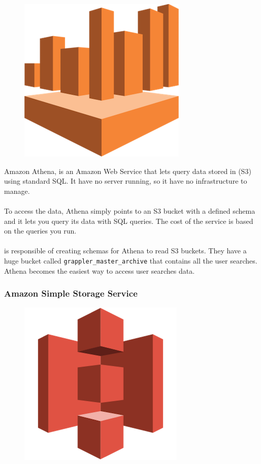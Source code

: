 \begin{figure}[H]
\includegraphics[scale=0.1]{resources/athena-logo.png}
\end{figure}

Amazon Athena\cite{athena}, is an Amazon Web Service that lets query data stored in  (S3) using standard SQL\cite{sql}. It have no server running, so it have no infrastructure to manage.
\\\\
To access the data, Athena simply points to an S3 bucket with a defined schema and it lets you query its data with SQL queries. The cost of the service is based on the queries you run.
\\\\
 is responsible of creating schemas for Athena to read S3 buckets. They have a huge bucket called \texttt{grappler\_master\_archive} that contains all the user searches. Athena becomes the easiest way to access user searches data.

\subsubsection*{Amazon Simple Storage Service} \label{s3}

\begin{figure}[H]
\includegraphics[scale=0.1]{resources/s3-logo.png}
\end{figure}

